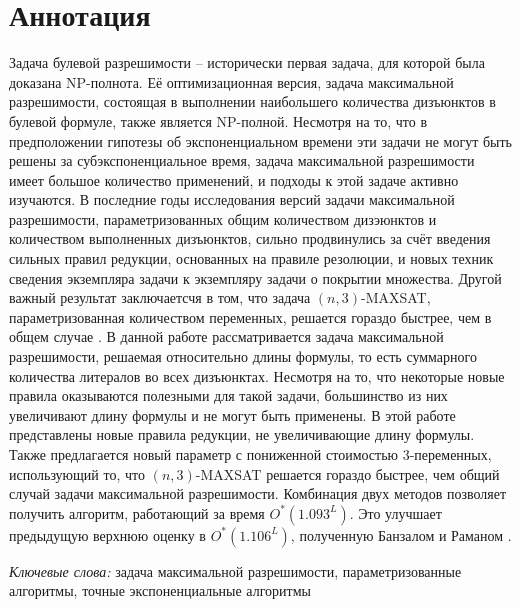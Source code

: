 
\section*{Аннотация}
\label{sec:annotation}

\firstpar{}Задача булевой разрешимости -- исторически первая задача, для которой была доказана NP-полнота. Её оптимизационная версия, задача максимальной разрешимости, состоящая в выполнении наибольшего количества дизъюнктов в булевой формуле, также является NP-полной. Несмотря на то, что в предположении гипотезы об экспоненциальном времени эти задачи не могут быть решены за субэкспоненциальное время, задача максимальной разрешимости имеет большое количество применений, и подходы к этой задаче активно изучаются. В последние годы исследования версий задачи максимальной разрешимости, параметризованных общим количеством дизэюнктов и количеством выполненных дизъюнктов, сильно продвинулись за счёт введения сильных правил редукции, основанных на правиле резолюции, и новых техник сведения экземпляра задачи к экземпляру задачи о покрытии множества. Другой важный результат заключаетсчя в том, что задача $(n,3)$-MAXSAT, параметризованная количеством переменных, решается гораздо быстрее, чем в общем случае \cite{belova18}. В данной работе рассматривается задача максимальной разрешимости, решаемая относительно длины формулы, то есть суммарного количества литералов во всех дизъюнктах. Несмотря на то, что некоторые новые правила оказываются полезными для такой задачи, большинство из них увеличивают длину формулы и не могут быть применены. В этой работе представлены новые правила редукции, не увеличивающие длину формулы. Также предлагается новый параметр с пониженной стоимостью 3-переменных, использующий то, что $(n,3)$-MAXSAT решается гораздо быстрее, чем общий случай задачи максимальной разрешимости. Комбинация двух методов позволяет получить алгоритм, работающий за время $O^*(1.093^L)$. Это улучшает предыдущую верхнюю оценку в $O^*(1.106^L)$, полученную Банзалом и Раманом \cite{bansal99}.

\vspace{14pt}

\textit{Ключевые слова:} задача максимальной разрешимости, параметризованные алгоритмы, точные экспоненциальные алгоритмы

\newpage

